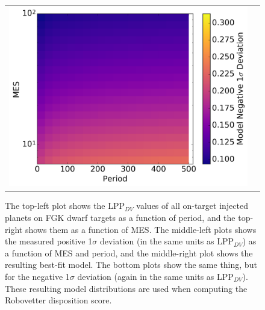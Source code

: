 \begin{figure}[hp]
\begin{tabular}{cc}
\includegraphics[width=0.485\linewidth]{ScoreFig-6.pdf}
\end{tabular}
\caption{The top-left plot shows the LPP$_{DV}$ values of all on-target injected planets on FGK dwarf targets as a function of period, and the top-right shows them as a function of MES. The middle-left plots shows the measured positive 1$\sigma$ deviation (in the same units as LPP$_{DV}$) as a function of MES and period, and the middle-right plot shows the resulting best-fit model. The bottom plots show the same thing, but for the negative 1$\sigma$ deviation (again in the same units as LPP$_{DV}$). These resulting model distributions are used when computing the Robovetter disposition score.}
\label{score-fig-1}
\end{figure}
